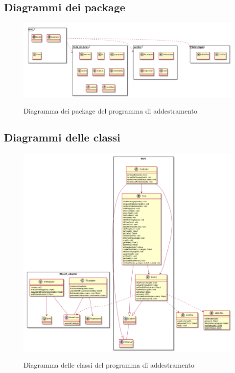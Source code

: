 \documentclass[../specifica-tecnica.tex]{subfiles}
\begin{document}
\subsection{Diagrammi dei package}
\begin{figure}[H]
  \begin{center}
    \includegraphics[width=18cm]{../../diagrammi/diagrammi-training-app/out/packagesDiagram.png}\\
    \caption{Diagramma dei package del programma di addestramento}%
  \end{center}
\end{figure}

\newpage

\subsection{Diagrammi delle classi}
\begin{figure}[H]
  \begin{center}
    \includegraphics[width=18cm]{../../diagrammi/diagrammi-training-app/out/classDiagram.png}\\
    \caption{Diagramma delle classi del programma di addestramento}%
  \end{center}
\end{figure}
\end{document}

